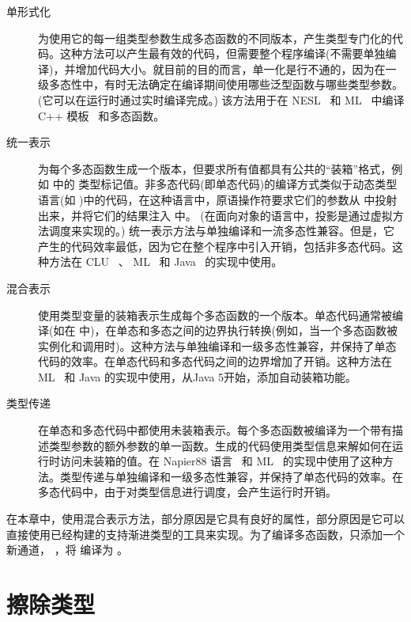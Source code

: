 \documentclass[11pt]{book}
\begin{document}
\begin{description}
\item[单形式化] 为使用它的每一组类型参数生成多态函数的不同版本，产生类型专门化的代码。这种方法可以产生最有效的代码，但需要整个程序编译(不需要单独编译)，并增加代码大小。就目前的目的而言，单一化是行不通的，因为在一级多态性中，有时无法确定在编译期间使用哪些泛型函数与哪些类型参数。(它可以在运行时通过实时编译完成。) 该方法用于在 NESL~\citep{Blelloch:1993aa} 和
  ML~\citep{Weeks:2006aa} 中编译 C++
  模板~\citep{stroustrup88:_param_types} 和多态函数。
  
\item[统一表示] 为每个多态函数生成一个版本，但要求所有值都具有公共的“装箱”格式，例如 \LangAny{} 中的  类型标记值。非多态代码(即单态代码)的编译方式类似于动态类型语言(如 \LangDyn{} )中的代码，在这种语言中，原语操作符要求它们的参数从  中投射出来，并将它们的结果注入  中。 (在面向对象的语言中，投影是通过虚拟方法调度来实现的。) 统一表示方法与单独编译和一流多态性兼容。但是，它产生的代码效率最低，因为它在整个程序中引入开销，包括非多态代码。这种方法在
  CLU~\cite{liskov79:_clu_ref,Liskov:1993dk} 、
  ML~\citep{Cardelli:1984aa,Appel:1987aa} 和
  Java~\citep{Bracha:1998fk} 的实现中使用。
  
\item[混合表示] 使用类型变量的装箱表示生成每个多态函数的一个版本。单态代码通常被编译(如在 \LangLoop{} 中)，在单态和多态之间的边界执行转换(例如，当一个多态函数被实例化和调用时)。这种方法与单独编译和一级多态性兼容，并保持了单态代码的效率。在单态代码和多态代码之间的边界增加了开销。这种方法在 ML~\citep{Leroy:1992qb} 和 Java 的实现中使用，从Java 5开始，添加自动装箱功能。
  
\item[类型传递] 在单态和多态代码中都使用未装箱表示。每个多态函数被编译为一个带有描述类型参数的额外参数的单一函数。生成的代码使用类型信息来解如何在运行时访问未装箱的值。在 Napier88
  语言~\citep{Morrison:1991aa} 和 ML~\citep{Harper:1995um} 的实现中使用了这种方法。类型传递与单独编译和一级多态性兼容，并保持了单态代码的效率。在多态代码中，由于对类型信息进行调度，会产生运行时开销。
\end{description}

在本章中，使用混合表示方法，部分原因是它具有良好的属性，部分原因是它可以直接使用已经构建的支持渐进类型的工具来实现。为了编译多态函数，只添加一个新通道，  ，将 \LangInst{} 编译为
\LangCast{} 。

\section{擦除类型}
\label{sec:erase-types}
\end{document}
